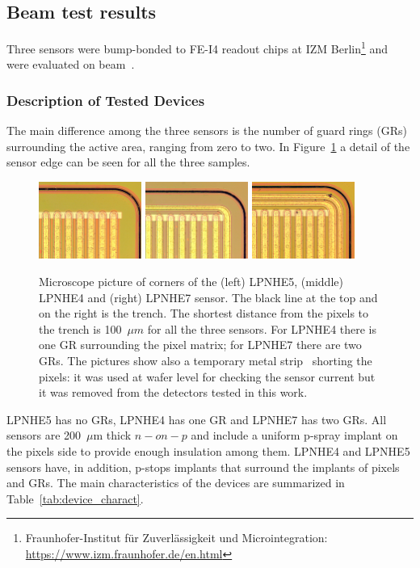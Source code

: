 \subsection{Beam test results}
Three sensors were bump-bonded to FE-I4 readout chips at IZM Berlin\footnote{Fraunhofer-Institut f\"ur Zuverl\"assigkeit und Microintegration: \url{https://www.izm.fraunhofer.de/en.html}} and were evaluated on beam~\cite{1748-0221-12-05-P05006}.

\subsubsection{Description of Tested Devices}
The main difference among the three sensors is  the number of guard rings (GRs) surrounding the active area, ranging from zero to two. In Figure~\ref{fig:lpnhe5_4_7_pic} a detail of the
sensor edge can be seen for all the three samples.

\begin{figure}[!htb]
\centering
\includegraphics[width=0.30\textwidth]{fei4_100um_0GRs.jpeg}
\includegraphics[width=0.30\textwidth]{fei4_100um_1GRs.jpeg}
\includegraphics[width=0.30\textwidth]{fei4_100um_2GRs.jpeg}
\caption{\label{fig:lpnhe5_4_7_pic}Microscope picture of corners of the  (left) LPNHE5, (middle) LPNHE4  and (right) LPNHE7 sensor. The black line at the top and on the right is the trench. The  shortest distance from the pixels to the trench is 100~$\mu m$ for all the three sensors. For LPNHE4 there is  one GR surrounding the pixel matrix; for LPNHE7 there are two GRs. The pictures show also a temporary metal strip~\cite{bib:metal} shorting the pixels: it was used at wafer level for checking the sensor current  but it was removed from the detectors tested in this work.}
\end{figure}
LPNHE5 has no GRs, LPNHE4 has one GR and LPNHE7 has two GRs. All sensors are 200~$\mu$m thick $n-on-p$ and include a uniform p-spray implant on the pixels side to provide enough insulation among them. LPNHE4 and LPNHE5 sensors have, in addition, p-stops implants that surround the implants of pixels and GRs.
The main  characteristics of the devices are summarized in Table~\ref{tab:device_charact}.

